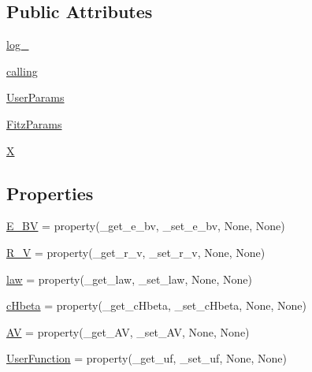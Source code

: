 \subsection*{Public Attributes}
\begin{DoxyCompactItemize}
\item 
\hyperlink{classpyneb_1_1extinction_1_1red__corr_1_1_red_corr_afd87151907f32bc0dc45f0171b61374e}{log\+\_\+}
\item 
\hyperlink{classpyneb_1_1extinction_1_1red__corr_1_1_red_corr_ab25fa7ebe84b603684dee62410c1e34c}{calling}
\item 
\hyperlink{classpyneb_1_1extinction_1_1red__corr_1_1_red_corr_a3b4156da5a457bf68c8b9d9c938edfa4}{User\+Params}
\item 
\hyperlink{classpyneb_1_1extinction_1_1red__corr_1_1_red_corr_a2db36f18d639dd5ae951cddd74bcc613}{Fitz\+Params}
\item 
\hyperlink{classpyneb_1_1extinction_1_1red__corr_1_1_red_corr_ac51b57a703ba1c5869228690c93e1701}{X}
\end{DoxyCompactItemize}
\subsection*{Properties}
\begin{DoxyCompactItemize}
\item 
\hyperlink{classpyneb_1_1extinction_1_1red__corr_1_1_red_corr_a97e4002139fdfd6739469528ea43b064}{E\+\_\+\+B\+V} = property(\+\_\+get\+\_\+e\+\_\+bv, \+\_\+set\+\_\+e\+\_\+bv, None, None)
\item 
\hyperlink{classpyneb_1_1extinction_1_1red__corr_1_1_red_corr_a9313bb1dc92bcd1947e92d79d23c19a7}{R\+\_\+\+V} = property(\+\_\+get\+\_\+r\+\_\+v, \+\_\+set\+\_\+r\+\_\+v, None, None)
\item 
\hyperlink{classpyneb_1_1extinction_1_1red__corr_1_1_red_corr_ab3fed296830f924db8afe5aeac4904ce}{law} = property(\+\_\+get\+\_\+law, \+\_\+set\+\_\+law, None, None)
\item 
\hyperlink{classpyneb_1_1extinction_1_1red__corr_1_1_red_corr_a50ca368c1b96db154e41c1534fa193cd}{c\+Hbeta} = property(\+\_\+get\+\_\+c\+Hbeta, \+\_\+set\+\_\+c\+Hbeta, None, None)
\item 
\hyperlink{classpyneb_1_1extinction_1_1red__corr_1_1_red_corr_a1b9a68c59df50a1a41c93512931c625d}{A\+V} = property(\+\_\+get\+\_\+\+A\+V, \+\_\+set\+\_\+\+A\+V, None, None)
\item 
\hyperlink{classpyneb_1_1extinction_1_1red__corr_1_1_red_corr_a0f4324192e2ead5408d8a1ab24be7e08}{User\+Function} = property(\+\_\+get\+\_\+uf, \+\_\+set\+\_\+uf, None, None)
\end{DoxyCompactItemize}


